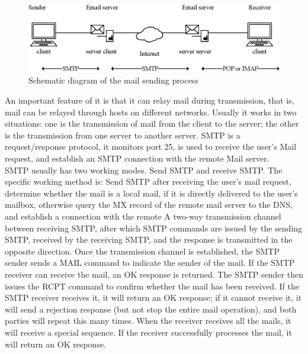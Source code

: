 \begin{figure}[!ht]
	\centering
	\includegraphics[width=15cm]{grafiken/2.10.eps}
	\caption{Schematic diagram of the mail sending process} 
	\label{fig:2.10}
\end{figure}
\FloatBarrier

An important feature of it is that it can relay mail during transmission, that is, mail can be relayed through hosts on different networks. Usually it works in two situations: one is the transmission of mail from the client to the server; the other is the transmission from one server to another server. SMTP is a request/response protocol, it monitors port 25, is used to receive the user's Mail request, and establish an SMTP connection with the remote Mail server.
\\
SMTP usually has two working modes. Send SMTP and receive SMTP. The specific working method is: Send SMTP after receiving the user's mail request, determine whether the mail is a local mail, if it is directly delivered to the user's mailbox, otherwise query the MX record of the remote mail server to the DNS, and establish a connection with the remote A two-way transmission channel between receiving SMTP, after which SMTP commands are issued by the sending SMTP, received by the receiving SMTP, and the response is transmitted in the opposite direction. Once the transmission channel is established, the SMTP sender sends a MAIL command to indicate the sender of the mail. If the SMTP receiver can receive the mail, an OK response is returned. The SMTP sender then issues the RCPT command to confirm whether the mail has been received. If the SMTP receiver receives it, it will return an OK response; if it cannot receive it, it will send a rejection response (but not stop the entire mail operation), and both parties will repeat this many times. When the receiver receives all the mails, it will receive a special sequence. If the receiver successfully processes the mail, it will return an OK response.
\\


